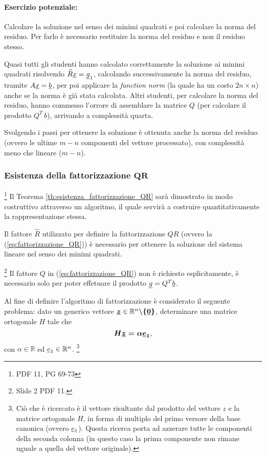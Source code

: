 \paragraph{Esercizio potenziale:}{Calcolare la soluzione nel senso dei minimi quadrati e poi calcolare la norma del residuo. Per farlo è necessario restituire la norma del residuo e non il residuo stesso. 

Quasi tutti gli studenti hanno calcolato correttamente la soluzione ai minimi quadrati risolvendo $\widehat R\uline x=\uline g_1$, calcolando successivamente la norma del residuo, tramite $A\uline x=\uline b$, per poi applicare la \textit{function norm} (la quale ha un costo $2n\times n$) anche se la norma è già stata calcolata. Altri studenti, per calcolare la norma del residuo, hanno commesso l'orrore di assemblare la matrice $Q$ (per calcolare il prodotto $Q^T\,b$), arrivando a complessità quarta. 

Svolgendo i passi per ottenere la soluzione è ottenuta anche la norma del residuo (ovvero le ultime $m-n$ componenti del vettore processato), con complessità meno che lineare ($m-n$).}

\subsubsection{Esistenza della fattorizzazione \texorpdfstring{$\boldsymbol {QR}$}{QR}}\label{sssec:esistenza_fattorizzazione_QR}
\footnote{PDF 11, PG 69-73}
Il Teorema \ref{th:esistenza_fattorizzazione_QR} sarà dimostrato in modo costruttivo attraverso un algoritmo, il quale servirà a costruire quantitativamente la rappresentazione stessa.

Il fattore $\widehat R$ utilizzato per definire la fattorizzazione $QR$ (ovvero la (\ref{eq:fattorizzazione_QR})) è necessario per ottenere la soluzione del sistema lineare nel senso dei minimi quadrati.

\begin{remark}\footnote{Slide 2 PDF 11.}
    Il fattore $Q$ in (\ref{eq:fattorizzazione_QR}) non è richiesto esplicitamente, è necessario solo per poter effetuare il prodotto $\uline g = Q^T\uline b$.
\end{remark}

Al fine di definire l'algoritmo di fattorizzazione è considerato il seguente problema: dato un generico vettore $\boldsymbol{\uline z}\in\mathbb R^n\boldsymbol{\backslash\{\uline 0\}}$, determinare una matrice ortogonale $H$ tale che
\begin{equation}\label{eq:Hz=ae1}
   \boldsymbol{H\uline z = \alpha\uline e_1},
\end{equation}
con $\alpha\in\mathbb R$ ed $\uline e_1\in\mathbb R^n$. \footnote{Ciò che è ricercato è il vettore risultante dal prodotto del vettore $z$ e la matrice ortogonale $H$, in forma di multiplo del primo versore della base canonica (ovvero $\uline e_1$). Questa ricerca porta ad azzerare tutte le componenti della seconda colonna (in questo caso la prima componente non rimane uguale a quella del vettore originale).}

